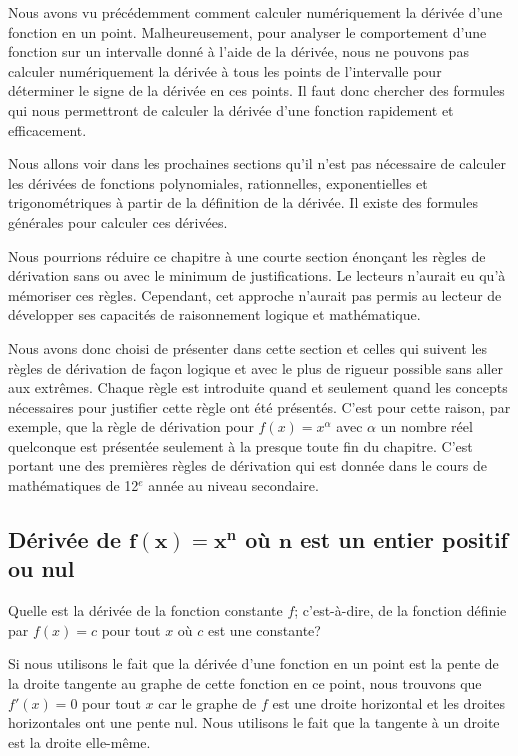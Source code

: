 {Nous avons vu précédemment comment calculer numériquement la dérivée d'une
fonction en un point.  Malheureusement, pour analyser le comportement
d'une fonction sur un intervalle donné à l'aide de la dérivée, nous ne
pouvons pas calculer numériquement la dérivée à tous les points de
l'intervalle pour déterminer le signe de la dérivée en ces points.  Il
faut donc chercher des formules qui nous permettront de calculer la
dérivée d'une fonction rapidement et efficacement.

Nous allons voir dans les prochaines sections qu'il n'est pas
nécessaire de calculer les dérivées de fonctions polynomiales,
rationnelles, exponentielles et trigonométriques à partir de la
définition de la dérivée.  Il existe des formules générales pour
calculer ces dérivées.

Nous pourrions réduire ce chapitre à une courte section énonçant
les règles de dérivation sans ou avec le minimum de justifications.
Le lecteurs n'aurait eu qu'à mémoriser ces règles.  Cependant, cet
approche n'aurait pas permis au lecteur de développer ses capacités
de raisonnement logique et mathématique.

Nous avons donc choisi de présenter dans cette section et celles qui
suivent les règles de dérivation de façon logique et avec le plus de
rigueur possible sans aller aux extrêmes.  Chaque règle est introduite
quand et seulement quand les concepts nécessaires pour justifier cette
règle ont été présentés.  C'est pour cette raison, par exemple, que la
règle de dérivation pour $f(x) = x^\alpha$ avec $\alpha$ un nombre
réel quelconque est présentée seulement à la presque toute fin du
chapitre.   C'est portant une des premières règles de dérivation qui
est donnée dans le cours de mathématiques de 12$^e$ année au niveau
secondaire.

\subsection{Dérivée de $\mathbf{f(x) = x^n}$ où $\mathbf n$ est
un entier positif ou nul}

Quelle est la dérivée de la fonction constante $f$; c'est-à-dire, de
la fonction définie par $f(x) = c$ pour tout $x$ où $c$ est une
constante?

Si nous utilisons le fait que la dérivée d'une fonction en un point est la
pente de la droite tangente au graphe de cette fonction en ce point,
nous trouvons que $f'(x) = 0$ pour tout $x$ car le graphe de $f$ est une
droite horizontal et les droites horizontales ont une pente nul.  Nous
utilisons le fait que la tangente à un droite est la droite elle-même.

}
